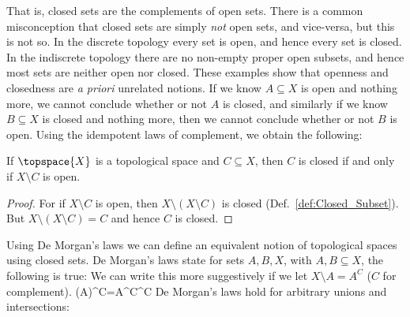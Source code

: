 \documentclass[oneside]{book}                                                  %
\begin{document}
                That is, closed sets are the complements of open sets. There is
                a common misconception that closed sets are simply \textit{not}
                open sets, and vice-versa, but this is not so. In the discrete
                topology every set is open, and hence every set is closed. In
                the indiscrete topology there are no non-empty proper open
                subsets, and hence most sets are neither open nor closed. These
                examples show that openness and closedness are
                \textit{a priori} unrelated notions. If we know $A\subseteq{X}$
                is open and nothing more, we cannot conclude whether or not $A$
                is closed, and similarly if we know $B\subseteq{X}$ is closed
                and nothing more, then we cannot conclude whether or not $B$ is
                open. Using the idempotent laws of complement, we obtain the
                following:
                \begin{theorem}
                    \label{thm:Closed_Iff_Comp_is_Open}%
                    If $\topspace{X}$ is a topological space and
                    $C\subseteq{X}$, then $C$ is closed if and only if
                    $X\setminus{C}$ is open.
                \end{theorem}
                \begin{proof}
                    For if $X\setminus{C}$ is open, then
                    $X\setminus(X\setminus{C})$ is closed
                    (Def.~\ref{def:Closed_Subset}). But
                    $X\setminus(X\setminus{C})=C$ and hence $C$ is closed.
                \end{proof}
                \par\hfill\par
                Using De Morgan's laws we can define an equivalent notion of
                topological spaces using closed sets. De Morgan's laws state for
                sets $A,B,X$, with $A,B\subseteq{X}$, the following is true:
                We can write this more suggestively if we let
                $X\setminus{A}=A^{C}$ ($C$ for complement).
                            {(A)^{C}=A^{C}^{C}}
                De Morgan's laws hold for arbitrary unions and intersections:
\end{document}
